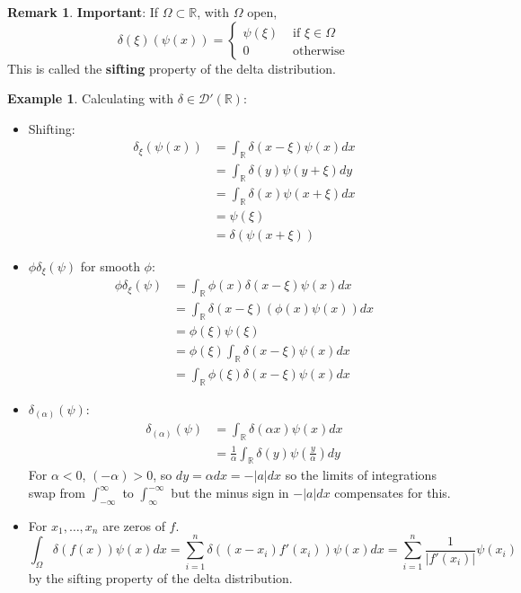 \documentclass[12pt,a4paper]{article}
\theoremstyle{definition}
\newtheorem{example}[definition]{Example}
\newtheorem*{remark}{Remark}
\begin{document}
\begin{remark}
	\textbf{Important}: If $\Omega \subset \mathbb{R}$, with $\Omega$ open,
	\[
		\delta(\xi) (\psi(x)) = \begin{cases}
			\psi(\xi) & \text{ if } \xi \in \Omega \\
			0 & \text{ otherwise}
		\end{cases}
	\]
	This is called the \textbf{sifting} property of the delta distribution.
\end{remark}

\begin{example}
	Calculating with $\delta \in \mathcal{D}'(\mathbb{R})$:
	\begin{itemize}
		\item Shifting:
		\[
			\begin{aligned}
				\delta_{\xi} (\psi(x))
					& = \int_\mathbb{R} \delta(x - \xi) \psi(x) dx \\
					& = \int_{\mathbb{R}} \delta(y) \psi(y + \xi) dy \\
					& = \int_{\mathbb{R}} \delta(x) \psi(x + \xi) dx \\
					& = \psi(\xi) \\
					& = \delta(\psi(x + \xi))
			\end{aligned}
		\]
		\item $\phi \delta_{\xi} (\psi)$ for smooth $\phi$:
		\[
			\begin{aligned}
				\phi \delta_{\xi} (\psi)
					& = \int_{\mathbb{R}} \phi(x) \delta(x - \xi) \psi(x) dx \\
					& = \int_{\mathbb{R}} \delta(x - \xi) (\phi(x) \psi(x)) dx \\
					& = \phi(\xi) \psi(\xi) \\
					& = \phi(\xi) \int_{\mathbb{R}} \delta(x - \xi) \psi(x) dx \\
					& = \int_{\mathbb{R}} \phi(\xi) \delta(x - \xi) \psi(x) dx
			\end{aligned}
		\]
		\item $\delta_{(\alpha)} (\psi)$:
		\[
			\begin{aligned}
				\delta_{(\alpha)} (\psi)
					& = \int_{\mathbb{R}} \delta(\alpha x) \psi(x) dx \\
					& = \frac{1}{\alpha} \int_{\mathbb{R}} \delta(y) \psi \left( \frac{y}{\alpha} \right) dy
			\end{aligned}
		\]
		For $\alpha < 0$, $(-\alpha) > 0$, so $dy = \alpha dx = -|a| dx$ so the limits of integrations swap from $\int_{-\infty}^{\infty}$ to $\int_{\infty}^{-\infty}$ but the minus sign in $-|a| dx$ compensates for this.
		\item For $x_1, \dots, x_n$ are zeros of $f$.
		\[
			\int_{\Omega} \delta(f(x)) \psi(x) dx = \sum_{i = 1}^{n} \delta((x - x_i) f'(x_i)) \psi(x) dx = \sum_{i = 1}^{n} \frac{1}{|f'(x_i)|} \psi(x_i)
		\]
		by the sifting property of the delta distribution.
	\end{itemize}
\end{example}
\end{document}
